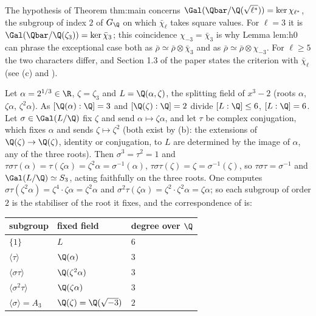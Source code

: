 \begin{paperlink}
The hypothesis of Theorem thm:main concerns $\Gal(\Qbar/\Q(\sqrt{\ell^*}))=\ker\chi_{\ell^*}$, the subgroup of index $2$ of $G_\Q$ on which $\bar\chi_\ell$ takes square
values. For $\ell=3$ it is $\Gal(\Qbar/\Q(\zeta_3))=\ker\bar\chi_3$; this coincidence $\chi_{-3}=\bar\chi_3$ is why Lemma lem:h0 can phrase the exceptional case both as
$\bar\rho\simeq\bar\rho\otimes\bar\chi_3$ and as $\bar\rho\simeq\bar\rho\otimes\chi_{-3}$. For $\ell\ge5$ the two characters differ, and Section 1.3 of the paper states the
criterion with $\bar\chi_\ell$ (see (c) and ).
\end{paperlink}

\begin{example}\label{ex:galois:x3minus2}
Let $\alpha=2^{1/3}\in\R$, $\zeta=\zeta_3$ and $L=\Q(\alpha,\zeta)$, the splitting field of $x^3-2$ (roots $\alpha$, $\zeta\alpha$, $\zeta^2\alpha$). As $[\Q(\alpha):\Q]=3$
and $[\Q(\zeta):\Q]=2$ divide $[L:\Q]\le6$, $[L:\Q]=6$. Let $\sigma\in\Gal(L/\Q)$ fix $\zeta$ and send $\alpha\mapsto\zeta\alpha$, and let $\tau$ be complex conjugation,
which fixes $\alpha$ and sends $\zeta\mapsto\zeta^2$ (both exist by (b): the extensions of $\Q(\zeta)\to\Q(\zeta)$, identity or
conjugation, to $L$ are determined by the image of $\alpha$, any of the three roots). Then $\sigma^3=\tau^2=1$ and $\tau\sigma\tau(\alpha)=\tau(\zeta\alpha)=\zeta^2\alpha=
\sigma^{-1}(\alpha)$, $\tau\sigma\tau(\zeta)=\zeta=\sigma^{-1}(\zeta)$, so $\tau\sigma\tau=\sigma^{-1}$ and $\Gal(L/\Q)\simeq S_3$, acting faithfully on the three
roots. One computes $\sigma\tau(\zeta^2\alpha)=\zeta^4\cdot\zeta\alpha=\zeta^2\alpha$ and $\sigma^2\tau(\zeta\alpha)=\zeta^2\cdot\zeta^2\alpha=\zeta\alpha$; so each subgroup of
order $2$ is the stabiliser of the root it fixes, and the correspondence of  is:
\begin{center}
\begin{tabular}{lll}
\toprule
subgroup & fixed field & degree over $\Q$\\
\midrule
$\{1\}$ & $L$ & $6$\\
$\langle\tau\rangle$ & $\Q(\alpha)$ & $3$\\
$\langle\sigma\tau\rangle$ & $\Q(\zeta^2\alpha)$ & $3$\\
$\langle\sigma^2\tau\rangle$ & $\Q(\zeta\alpha)$ & $3$\\
$\langle\sigma\rangle=A_3$ & $\Q(\zeta)=\Q(\sqrt{-3})$ & $2$\\

\end{tabular}
\end{center}
\end{example}
